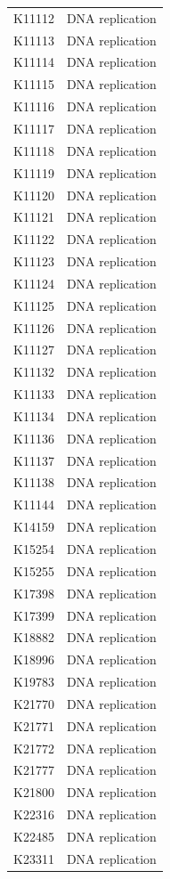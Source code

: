 \begin{longtable}{@{}l l@{}}
K11112 & DNA replication \\
K11113 & DNA replication \\
K11114 & DNA replication \\
K11115 & DNA replication \\
K11116 & DNA replication \\
K11117 & DNA replication \\
K11118 & DNA replication \\
K11119 & DNA replication \\
K11120 & DNA replication \\
K11121 & DNA replication \\
K11122 & DNA replication \\
K11123 & DNA replication \\
K11124 & DNA replication \\
K11125 & DNA replication \\
K11126 & DNA replication \\
K11127 & DNA replication \\
K11132 & DNA replication \\
K11133 & DNA replication \\
K11134 & DNA replication \\
K11136 & DNA replication \\
K11137 & DNA replication \\
K11138 & DNA replication \\
K11144 & DNA replication \\
K14159 & DNA replication \\
K15254 & DNA replication \\
K15255 & DNA replication \\
K17398 & DNA replication \\
K17399 & DNA replication \\
K18882 & DNA replication \\
K18996 & DNA replication \\
K19783 & DNA replication \\
K21770 & DNA replication \\
K21771 & DNA replication \\
K21772 & DNA replication \\
K21777 & DNA replication \\
K21800 & DNA replication \\
K22316 & DNA replication \\
K22485 & DNA replication \\
K23311 & DNA replication \\

\end{longtable}
